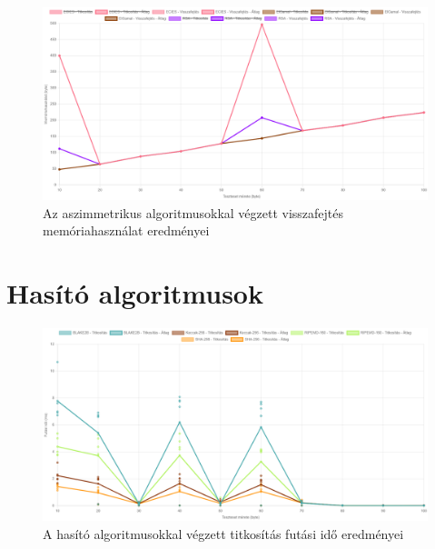 \documentclass[12pt]{report} %
\begin{document}
\begin{figure}[H]
    \centering %
    \includegraphics[width=\textwidth]{Figures/AsymmetricDecryptionMemoryUsage.png} %
    \caption{Az aszimmetrikus algoritmusokkal végzett visszafejtés memóriahasználat eredményei} %
    \label{fig:AsymmetricDecryptionMemoryUsage} %
\end{figure}

\section{Hasító algoritmusok} %

\begin{figure}[H]
    \centering %
    \includegraphics[width=\textwidth]{Figures/HashingEncryptionRunTime.png} %
    \caption{A hasító algoritmusokkal végzett titkosítás futási idő eredményei} %
    \label{fig:HashingEncryptionRunTime} %
\end{figure}
\end{document}
